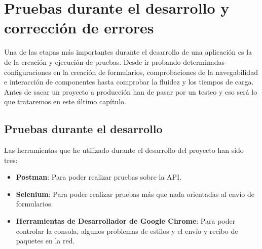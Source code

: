 \chapter{Pruebas durante el desarrollo y corrección de errores}
Una de las etapas más importantes durante el desarrollo de una aplicación es la de la creación y ejecución de pruebas. Desde ir probando determinadas configuraciones en la creación de formularios, comprobaciones de la navegabilidad e interacción de componentes hasta comprobar la fluidez y los tiempos de carga.
\\Antes de sacar un proyecto a producción han de pasar por un testeo y eso será lo que trataremos en este último capítulo.

\section{Pruebas durante el desarrollo}
Las herramientas que he utilizado durante el desarrollo del proyecto han sido tres:
\begin{itemize}
    \item \textbf{Postman}: Para poder realizar pruebas sobre la API.
    \item \textbf{Selenium}: Para poder realizar pruebas más que nada orientadas al envío de formularios.
    \item \textbf{Herramientas de Desarrollador de Google Chrome}: Para poder controlar la consola, algunos problemas de estilos y el envío y recibo de paquetes en la red.
\end{itemize}

